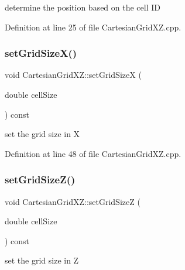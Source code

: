 determine the position based on the cell ID 



Definition at line 25 of file Cartesian\+Grid\+X\+Z.\+cpp.

\hypertarget{class_d_d4hep_1_1_geometry_1_1_cartesian_grid_x_z_a654091b4f1c548a47490848d2434b939}{}\label{class_d_d4hep_1_1_geometry_1_1_cartesian_grid_x_z_a654091b4f1c548a47490848d2434b939} 
\subsubsection{\texorpdfstring{set\+Grid\+Size\+X()}{setGridSizeX()}}
{\footnotesize\ttfamily void Cartesian\+Grid\+X\+Z\+::set\+Grid\+SizeX (\begin{DoxyParamCaption}\item[{double}]{cell\+Size }\end{DoxyParamCaption}) const}



set the grid size in X 



Definition at line 48 of file Cartesian\+Grid\+X\+Z.\+cpp.

\hypertarget{class_d_d4hep_1_1_geometry_1_1_cartesian_grid_x_z_aa2e1ab729fa67a539e9542d711a7381a}{}\label{class_d_d4hep_1_1_geometry_1_1_cartesian_grid_x_z_aa2e1ab729fa67a539e9542d711a7381a} 
\subsubsection{\texorpdfstring{set\+Grid\+Size\+Z()}{setGridSizeZ()}}
{\footnotesize\ttfamily void Cartesian\+Grid\+X\+Z\+::set\+Grid\+SizeZ (\begin{DoxyParamCaption}\item[{double}]{cell\+Size }\end{DoxyParamCaption}) const}



set the grid size in Z 



